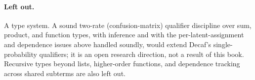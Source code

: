 \paragraph{Left out.}
A type system. A sound two-rate (confusion-matrix) qualifier discipline over sum,
product, and function types, with inference and with the per-latent-assignment
and dependence issues above handled soundly, would extend Decaf's
single-probability qualifiers; it is an open research direction, not a result of
this book. Recursive types beyond lists, higher-order functions, and dependence
tracking across shared subterms are also left out.
